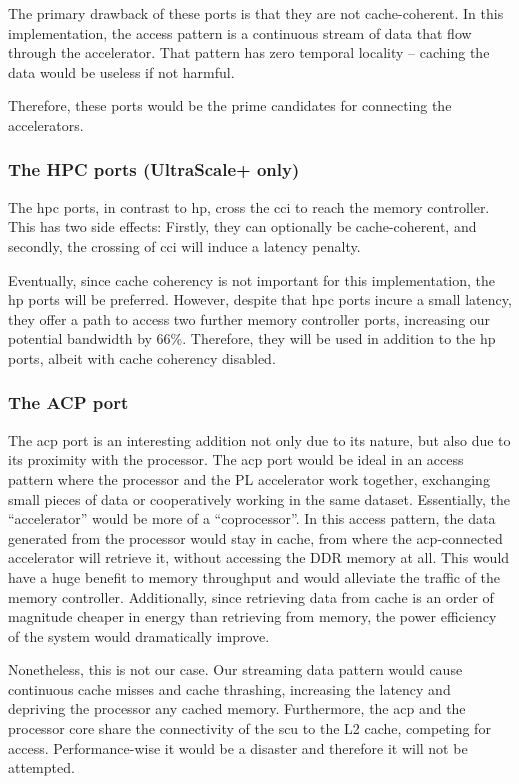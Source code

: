 The primary drawback of these ports is that they are not cache-coherent.
In this implementation, the access pattern is a continuous stream of data
that flow through the accelerator. That pattern has zero temporal locality --
caching the data would be useless if not harmful.

Therefore, these ports would be the prime candidates for connecting 
the accelerators.

\subsubsection{The HPC ports (UltraScale+ only)}

The \gls{hpc} ports, in contrast to \gls{hp}, cross the \gls{cci} to reach
the memory controller. This has two side effects: Firstly, they can 
optionally be cache-coherent, and secondly, the crossing of \gls{cci}
will induce a latency penalty.

Eventually, since cache coherency is not important for this implementation,
the \gls{hp} ports will be preferred. However, despite that \gls{hpc} ports
incure a small latency, they offer a path to access two further memory controller
ports, increasing our potential bandwidth by 66\%. 
Therefore, they will be used in addition to the \gls{hp} ports, albeit with
cache coherency disabled.

\subsubsection{The ACP port}

The \gls{acp} port is an interesting addition not only due to its 
nature, but also due to its proximity with the processor. 
The \gls{acp} port would be ideal in an access pattern where the processor and the PL accelerator
work together, exchanging small pieces of data or cooperatively working in the same dataset.
Essentially, the ``accelerator'' would be more of a ``coprocessor''.
In this access pattern, the data generated from the processor would stay in cache, from where
the \gls{acp}-connected accelerator will retrieve it, without accessing the DDR memory at all.
This would have a huge benefit to memory throughput and
would alleviate the traffic of the memory controller. Additionally, since retrieving data
from cache is an order of magnitude cheaper in energy than retrieving from memory,
the power efficiency of the system would dramatically improve.

Nonetheless, this is not our case. Our streaming data pattern would 
cause continuous cache misses and cache thrashing,
increasing the latency and depriving the processor any cached memory.
Furthermore, the \gls{acp} and the processor core share the connectivity
of the \gls{scu} to the L2 cache, competing for access.
Performance-wise it would be a disaster and therefore it will not be attempted.

